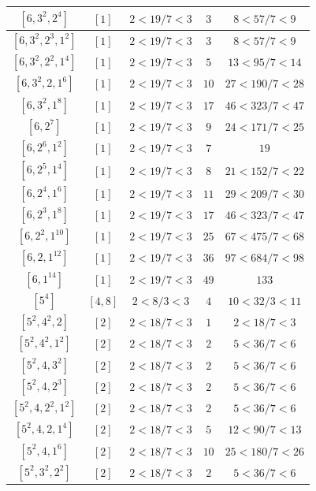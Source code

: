 \documentclass{article}%
\begin{document}
\begin{center}
\begin{longtable}{||c|c|c|c|c||}
$[6, 3^{2}, 2^{4}]$ & $[1]$ & $2 < 19/7 < 3$ & $3$ & $8 < 57/7 < 9$ \\ \hline 
$[6, 3^{2}, 2^{3}, 1^{2}]$ & $[1]$ & $2 < 19/7 < 3$ & $3$ & $8 < 57/7 < 9$ \\ \hline 
$[6, 3^{2}, 2^{2}, 1^{4}]$ & $[1]$ & $2 < 19/7 < 3$ & $5$ & $13 < 95/7 < 14$ \\ \hline 
$[6, 3^{2}, 2, 1^{6}]$ & $[1]$ & $2 < 19/7 < 3$ & $10$ & $27 < 190/7 < 28$ \\ \hline 
$[6, 3^{2}, 1^{8}]$ & $[1]$ & $2 < 19/7 < 3$ & $17$ & $46 < 323/7 < 47$ \\ \hline 
$[6, 2^{7}]$ & $[1]$ & $2 < 19/7 < 3$ & $9$ & $24 < 171/7 < 25$ \\ \hline 
$[6, 2^{6}, 1^{2}]$ & $[1]$ & $2 < 19/7 < 3$ & $7$ & $19$ \\ \hline 
$[6, 2^{5}, 1^{4}]$ & $[1]$ & $2 < 19/7 < 3$ & $8$ & $21 < 152/7 < 22$ \\ \hline 
$[6, 2^{4}, 1^{6}]$ & $[1]$ & $2 < 19/7 < 3$ & $11$ & $29 < 209/7 < 30$ \\ \hline 
$[6, 2^{3}, 1^{8}]$ & $[1]$ & $2 < 19/7 < 3$ & $17$ & $46 < 323/7 < 47$ \\ \hline 
$[6, 2^{2}, 1^{10}]$ & $[1]$ & $2 < 19/7 < 3$ & $25$ & $67 < 475/7 < 68$ \\ \hline 
$[6, 2, 1^{12}]$ & $[1]$ & $2 < 19/7 < 3$ & $36$ & $97 < 684/7 < 98$ \\ \hline 
$[6, 1^{14}]$ & $[1]$ & $2 < 19/7 < 3$ & $49$ & $133$ \\ \hline 
$[5^{4}]$ & $[4, 8]$ & $2 < 8/3 < 3$ & $4$ & $10 < 32/3 < 11$ \\ \hline 
$[5^{2}, 4^{2}, 2]$ & $[2]$ & $2 < 18/7 < 3$ & $1$ & $2 < 18/7 < 3$ \\ \hline 
$[5^{2}, 4^{2}, 1^{2}]$ & $[2]$ & $2 < 18/7 < 3$ & $2$ & $5 < 36/7 < 6$ \\ \hline 
$[5^{2}, 4, 3^{2}]$ & $[2]$ & $2 < 18/7 < 3$ & $2$ & $5 < 36/7 < 6$ \\ \hline 
$[5^{2}, 4, 2^{3}]$ & $[2]$ & $2 < 18/7 < 3$ & $2$ & $5 < 36/7 < 6$ \\ \hline 
$[5^{2}, 4, 2^{2}, 1^{2}]$ & $[2]$ & $2 < 18/7 < 3$ & $2$ & $5 < 36/7 < 6$ \\ \hline 
$[5^{2}, 4, 2, 1^{4}]$ & $[2]$ & $2 < 18/7 < 3$ & $5$ & $12 < 90/7 < 13$ \\ \hline 
$[5^{2}, 4, 1^{6}]$ & $[2]$ & $2 < 18/7 < 3$ & $10$ & $25 < 180/7 < 26$ \\ \hline 
$[5^{2}, 3^{2}, 2^{2}]$ & $[2]$ & $2 < 18/7 < 3$ & $2$ & $5 < 36/7 < 6$ \\ \hline 

\end{longtable}
\end{center}
\end{document}
